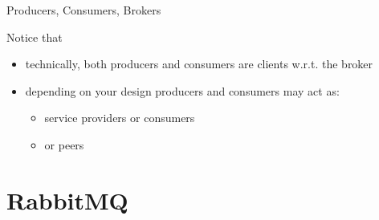 \documentclass{beamer}\mode<presentation>{\usetheme{AMSBolognaFC}}
\begin{document}
\begin{frame}[allowframebreaks]{Producers, Consumers, Brokers}
    \framebreak

    \begin{alertblock}{Notice that}
        \begin{itemize}
            \item technically, both producers and consumers are \alert{clients} w.r.t. the broker
            \item depending on your design producers and consumers may act as:
            \begin{itemize}
                \item service providers or consumers
                \item or peers
            \end{itemize}
        \end{itemize}
    \end{alertblock}

\end{frame}

\section{RabbitMQ}
\end{document}
